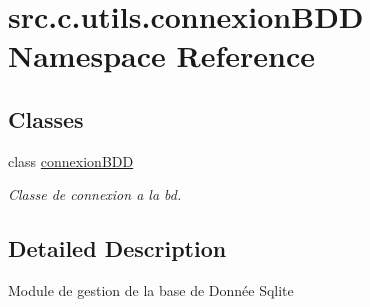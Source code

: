 \hypertarget{namespacesrc_1_1c_1_1utils_1_1connexion_b_d_d}{}\section{src.\+c.\+utils.\+connexion\+B\+D\+D Namespace Reference}
\label{namespacesrc_1_1c_1_1utils_1_1connexion_b_d_d}
\subsection*{Classes}
\begin{DoxyCompactItemize}
\item 
class \hyperlink{classsrc_1_1c_1_1utils_1_1connexion_b_d_d_1_1connexion_b_d_d}{connexion\+B\+D\+D}
\begin{DoxyCompactList}\small\item\em Classe de connexion a la bd. \end{DoxyCompactList}\end{DoxyCompactItemize}


\subsection{Detailed Description}
\begin{DoxyVerb}    Module de gestion de la base de Donnée Sqlite
\end{DoxyVerb}
 